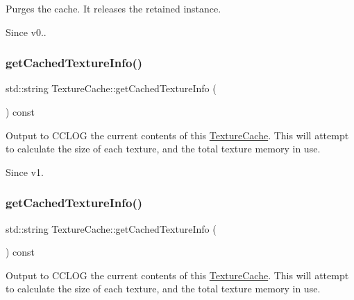 Purges the cache. It releases the retained instance. \begin{DoxySince}{Since}
v0.. 
\end{DoxySince}
\mbox{\label{classTextureCache_ab0aaf8d7d614ba1d5dcfac8ed7e1c4b2}} 
\subsubsection{\texorpdfstring{get\+Cached\+Texture\+Info()}{getCachedTextureInfo()}\hspace{0.1cm}{\footnotesize\ttfamily [1/2]}}
{\footnotesize\ttfamily std\+::string Texture\+Cache\+::get\+Cached\+Texture\+Info (\begin{DoxyParamCaption}{ }\end{DoxyParamCaption}) const}

Output to C\+C\+L\+OG the current contents of this \hyperlink{classTextureCache}{Texture\+Cache}. This will attempt to calculate the size of each texture, and the total texture memory in use.

\begin{DoxySince}{Since}
v1. 
\end{DoxySince}
\mbox{\label{classTextureCache_ab0aaf8d7d614ba1d5dcfac8ed7e1c4b2}} 
\subsubsection{\texorpdfstring{get\+Cached\+Texture\+Info()}{getCachedTextureInfo()}\hspace{0.1cm}{\footnotesize\ttfamily [2/2]}}
{\footnotesize\ttfamily std\+::string Texture\+Cache\+::get\+Cached\+Texture\+Info (\begin{DoxyParamCaption}{ }\end{DoxyParamCaption}) const}

Output to C\+C\+L\+OG the current contents of this \hyperlink{classTextureCache}{Texture\+Cache}. This will attempt to calculate the size of each texture, and the total texture memory in use.

